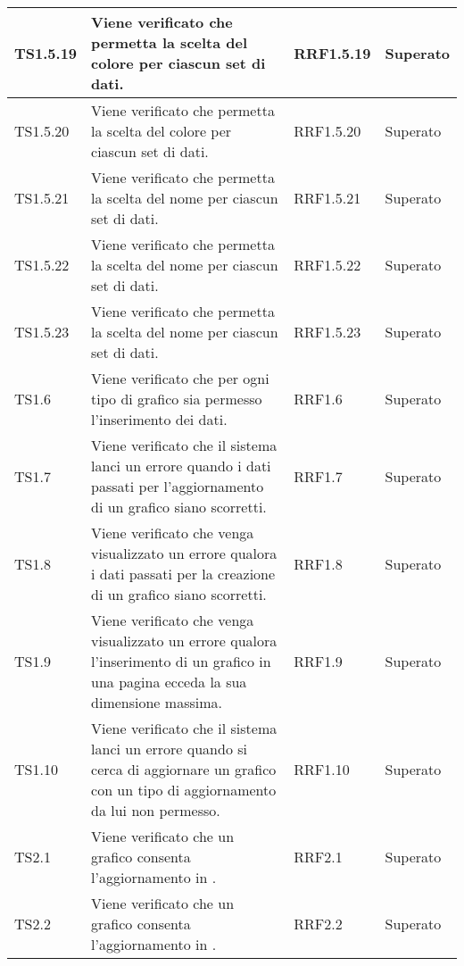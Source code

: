 \begin{longtabu}{| X[0.5] | X | X[0.5] | X[0.4] |}
TS1.5.19 & Viene verificato che  permetta la scelta del colore per ciascun set di dati. & RRF1.5.19 & Superato\\ \hline

TS1.5.20 & Viene verificato che  permetta la scelta del colore per ciascun set di dati. & RRF1.5.20 & Superato\\ \hline

TS1.5.21 &	Viene verificato che  permetta la scelta del nome per ciascun set di dati. & RRF1.5.21 & Superato\\ \hline

TS1.5.22 &	Viene verificato che  permetta la scelta del nome per ciascun set di dati. & RRF1.5.22 & Superato\\ \hline

TS1.5.23 &	Viene verificato che  permetta la scelta del nome per ciascun set di dati. & RRF1.5.23 & Superato\\ \hline

TS1.6 & Viene verificato che per ogni tipo di grafico sia permesso l'inserimento dei dati. & RRF1.6 & Superato\\ \hline

TS1.7 & Viene verificato che il sistema lanci un errore quando i dati passati per l'aggiornamento di un grafico siano scorretti. & RRF1.7 & Superato\\ \hline

TS1.8 & Viene verificato che venga visualizzato un errore qualora i dati passati per la creazione di un grafico siano scorretti. & RRF1.8 & Superato\\ \hline

TS1.9 & Viene verificato che venga visualizzato un errore qualora l'inserimento di un grafico in una pagina ecceda la sua dimensione massima. & RRF1.9 & Superato\\ \hline

TS1.10 & Viene verificato che il sistema lanci un errore quando si cerca di aggiornare un grafico con un tipo di aggiornamento da lui non permesso. & RRF1.10 & Superato\\ \hline

TS2.1 & Viene verificato che un grafico  consenta l'aggiornamento in . & RRF2.1 & Superato\\ \hline

TS2.2 & Viene verificato che un grafico  consenta l'aggiornamento in . & RRF2.2 & Superato\\ \hline


\end{longtabu}

